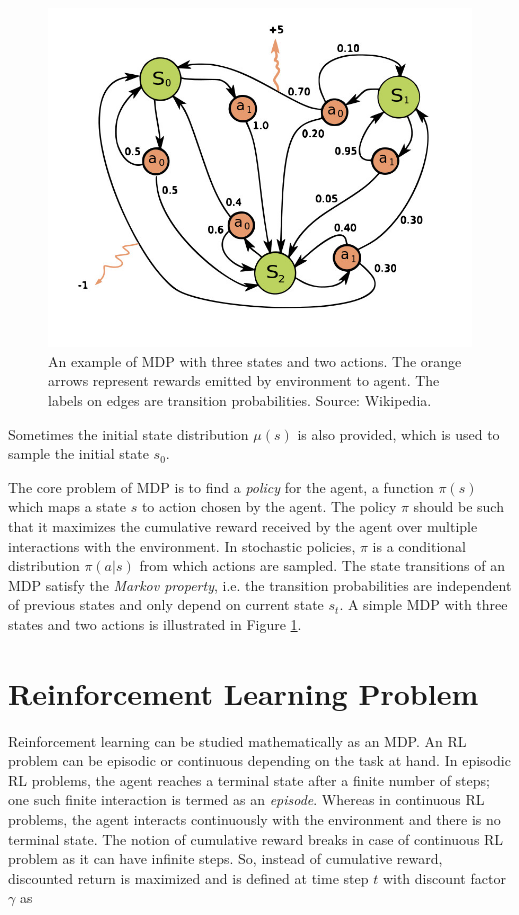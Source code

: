 \begin{figure}[!htb]
    \centering
    \includegraphics[width=.8\linewidth]{figures/02/mdp.jpg}
    \caption{An example of MDP with three states and two actions. The orange arrows represent rewards emitted by environment to agent. The labels on edges are transition probabilities. Source: Wikipedia.}
    \label{fig:02_mdp}
\end{figure}

Sometimes the initial state distribution $\mu(s)$ is also provided, which is used to sample the initial state $s_0$.

The core problem of MDP is to find a \textit{policy} for the agent, a function $\pi(s)$ which maps a state $s$ to action chosen by the agent. The policy $\pi$ should be such that it maximizes the cumulative reward received by the agent over multiple interactions with the environment. In stochastic policies, $\pi$ is a conditional distribution $\pi(a|s)$ from which actions are sampled. The state transitions of an MDP satisfy the \textit{Markov property}, i.e. the transition probabilities are independent of previous states and only depend on current state $s_t$. A simple MDP with three states and two actions is illustrated in Figure \ref{fig:02_mdp}.


\section{Reinforcement Learning Problem}
Reinforcement learning can be studied mathematically as an MDP. An RL problem can be episodic or continuous depending on the task at hand. In episodic RL problems, the agent reaches a terminal state after a finite number of steps; one such finite interaction is termed as an \textit{episode}. Whereas in continuous RL problems, the agent interacts continuously with the environment and there is no terminal state. The notion of cumulative reward breaks in case of continuous RL problem as it can have infinite steps.     So, instead of cumulative reward, discounted return is maximized and is defined at time step $t$ with discount factor $\gamma$ as 


